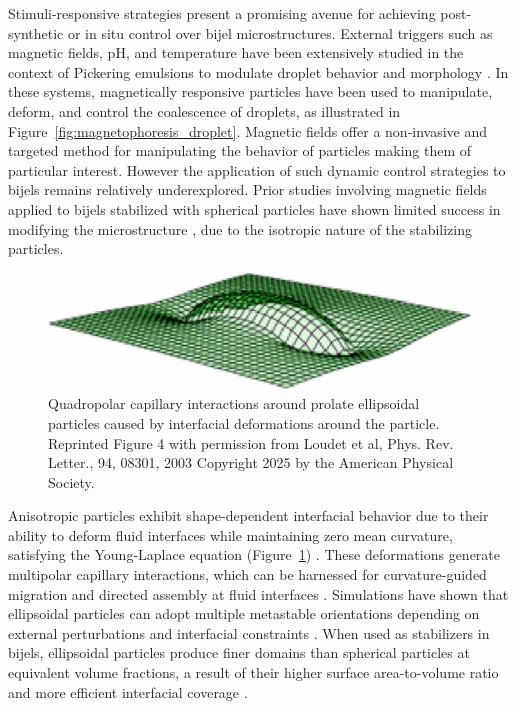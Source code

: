 Stimuli-responsive strategies present a promising avenue for achieving post-synthetic or in situ control over bijel microstructures. External triggers such as magnetic fields, pH, and temperature have 
been extensively studied in the context of Pickering emulsions to modulate droplet behavior and morphology \cite{tham_magnetophoresis_2021, cui_stabilizing_2013}. In these systems, magnetically 
responsive particles have been used to manipulate, deform, and control the coalescence of droplets, as illustrated in Figure~\ref{fig:magnetophoresis_droplet}. Magnetic 
fields offer a non-invasive and targeted method for manipulating the behavior of particles making them of particular interest. 
However the application of such dynamic control strategies to bijels remains relatively underexplored. Prior studies involving magnetic fields applied to bijels stabilized with spherical particles 
have shown limited success in modifying the microstructure \cite{kim_bijels_2010}, due to the isotropic nature of the stabilizing particles. 

\begin{figure}
    \centering
    \includegraphics[scale = 0.5]{figures/literature_review/interfacial_curvature.png}
    \caption{Quadropolar capillary interactions around prolate ellipsoidal particles caused by interfacial deformations 
             around the particle. \cite{loudet_capillary_2005} Reprinted Figure 4 with permission from
             Loudet et al, Phys. Rev. Letter., 94, 08301, 2003 Copyright 2025 by the American Physical Society.}
    \label{fig:anisotropic_particle_interface}
\end{figure}


Anisotropic particles exhibit shape-dependent interfacial behavior due to their ability to deform fluid interfaces while maintaining zero mean curvature, satisfying the Young-Laplace equation 
(Figure~\ref{fig:anisotropic_particle_interface}) \cite{loudet_capillary_2005, cheng_shape-anisotropic_2013}. These deformations generate multipolar capillary interactions, which can be harnessed 
for curvature-guided migration and directed assembly at fluid interfaces \cite{cavallaro_curvature-driven_2011, read_dimerization_2020, sharifi-mood_curvature_2015}. Simulations have shown that 
ellipsoidal particles can adopt multiple metastable orientations depending on external perturbations and interfacial constraints \cite{gunther_lattice_2013}. When used as stabilizers in bijels, 
ellipsoidal particles produce finer domains than spherical particles at equivalent volume fractions, a result of their higher surface area-to-volume ratio and more efficient interfacial coverage 
\cite{gunther_timescales_2014}.

